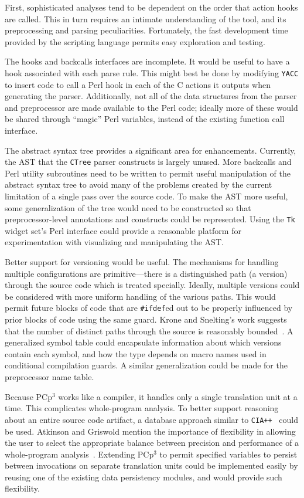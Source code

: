 \documentclass{article}
\newcommand{\pcp}{\mbox{\textsf{PCp}$^3$}}
\newcommand{\Perl}{\mbox{Perl}}
\newcommand{\C}{\mbox{C}}
\newcommand{\ppd}[1]{\texttt{\##1}}
\begin{document}
First, sophisticated analyses tend to be dependent on the order that
action hooks are called.  This in turn requires an intimate
understanding of the tool, and its preprocessing and parsing
peculiarities.  Fortunately, the fast development time provided by the
scripting language permits easy exploration and testing.

The hooks and backcalls interfaces are incomplete.  It would be useful
to have a hook associated with each parse rule.  This might best be
done by modifying \texttt{YACC} to insert code to call a \Perl{} hook
in each of the \C{} actions it outputs when generating the parser.
Additionally, not all of the data
structures from the parser and preprocessor are made available to the
\Perl{} code;  ideally more of these would be shared through ``magic''
\Perl{} variables, instead of the existing function call interface.

The abstract syntax tree provides a significant area for enhancements.
Currently, the AST that the \texttt{CTree} parser
constructs is largely unused.  More backcalls and \Perl{} utility
subroutines need to be written to permit useful manipulation of the
abstract syntax tree to avoid many of the problems created by the current
limitation of a single pass over the source code.  To make the AST
more useful, some generalization of the tree would need to be
constructed so that preprocessor-level annotations and constructs could be
represented.  Using the \texttt{Tk} widget set's \Perl{} interface could
provide a reasonable platform for experimentation with visualizing and
manipulating the AST.

Better support for versioning would be useful. The mechanisms for
handling multiple configurations are primitive---there is a
distinguished path (a version) through the source code which is treated
specially.  Ideally, multiple versions could be considered with more
uniform handling of the various paths.  This would
permit future blocks of code that are \ppd{ifdef}ed out to be properly
influenced by prior blocks of code using the same guard.  Krone and
Snelting's work suggests that the number of distinct paths through the
source is reasonably bounded~\cite{Krone94}.  A generalized symbol table
could encapsulate information about which versions contain each symbol,
and how the type depends on macro names used in conditional compilation
guards.  A similar generalization could be made for the preprocessor
name table.

Because \pcp{} works like a compiler, it handles only a single
translation unit at a time.  This complicates whole-program analysis.
To better support reasoning about an entire source code
artifact, a database approach similar to \texttt{CIA++}~\cite{CIA++90}
could be used.  Atkinson and Griswold mention the importance of flexibility in allowing
the user to select the appropriate balance between precision and
performance of a whole-program analysis~\cite{Atkinson96}.  Extending
\pcp{} to permit specified variables to persist between invocations on separate
translation units could be implemented easily by reusing one of the
existing data persistency modules, and would provide such flexibility.
\end{document}
